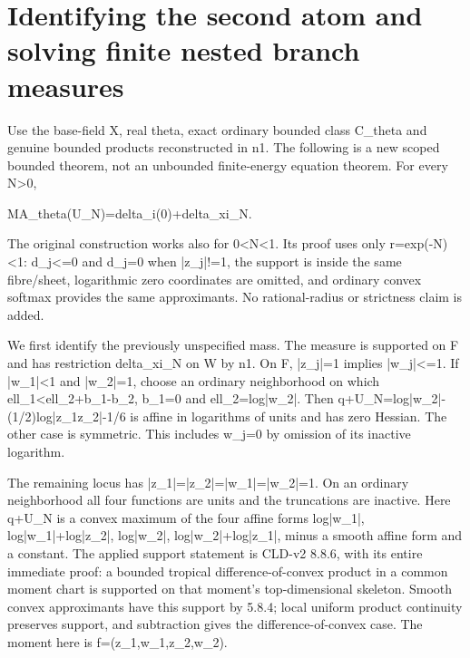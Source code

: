 \documentclass[11pt]{article}
\begin{document}
\section*{Identifying the second atom and solving finite nested branch measures}

Use the base-field X, real theta, exact ordinary bounded class C\_theta and genuine bounded products reconstructed in n1. The following is a new scoped bounded theorem, not an unbounded finite-energy equation theorem. For every N>0,

MA\_theta(U\_N)=delta\_i(0)+delta\_xi\_N.

The original construction works also for 0<N<1. Its proof uses only r=exp(-N)<1: d\_j<=0 and d\_j=0 when |z\_j|!=1, the support is inside the same fibre/sheet, logarithmic zero coordinates are omitted, and ordinary convex softmax provides the same approximants. No rational-radius or strictness claim is added.

We first identify the previously unspecified mass. The measure is supported on F and has restriction delta\_xi\_N on W by n1. On F, |z\_j|=1 implies |w\_j|<=1. If |w\_1|<1 and |w\_2|=1, choose an ordinary neighborhood on which ell\_1<ell\_2+b\_1-b\_2, b\_1=0 and ell\_2=log|w\_2|. Then q+U\_N=log|w\_2|-(1/2)log|z\_1z\_2|-1/6 is affine in logarithms of units and has zero Hessian. The other case is symmetric. This includes w\_j=0 by omission of its inactive logarithm.

The remaining locus has |z\_1|=|z\_2|=|w\_1|=|w\_2|=1. On an ordinary neighborhood all four functions are units and the truncations are inactive. Here q+U\_N is a convex maximum of the four affine forms log|w\_1|, log|w\_1|+log|z\_2|, log|w\_2|, log|w\_2|+log|z\_1|, minus a smooth affine form and a constant. The applied support statement is CLD-v2 8.8.6, with its entire immediate proof: a bounded tropical difference-of-convex product in a common moment chart is supported on that moment's top-dimensional skeleton. Smooth convex approximants have this support by 5.8.4; local uniform product continuity preserves support, and subtraction gives the difference-of-convex case. The moment here is f=(z\_1,w\_1,z\_2,w\_2).
\end{document}
